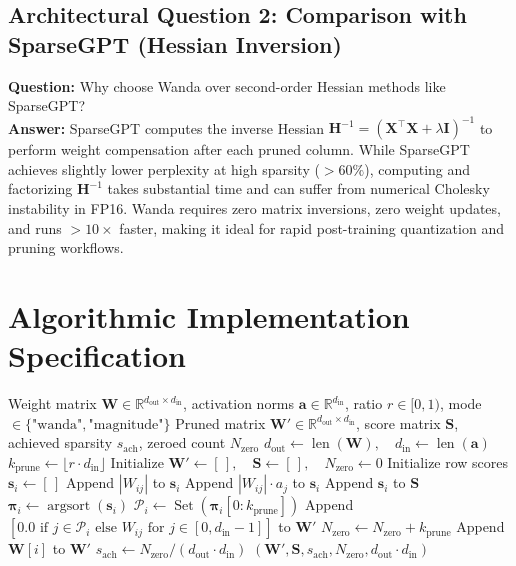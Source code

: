 \documentclass[11pt,a4paper]{article}
\theoremstyle{definition}
\begin{document}
\subsection{Architectural Question 2: Comparison with SparseGPT (Hessian Inversion)}
\textbf{Question:} Why choose Wanda over second-order Hessian methods like SparseGPT?\\
\textbf{Answer:} SparseGPT computes the inverse Hessian $\mathbf{H}^{-1} = (\mathbf{X}^\top \mathbf{X} + \lambda \mathbf{I})^{-1}$ to perform weight compensation after each pruned column. While SparseGPT achieves slightly lower perplexity at high sparsity ($>60\%$), computing and factorizing $\mathbf{H}^{-1}$ takes substantial time and can suffer from numerical Cholesky instability in FP16. Wanda requires zero matrix inversions, zero weight updates, and runs $>10\times$ faster, making it ideal for rapid post-training quantization and pruning workflows.

\section{Algorithmic Implementation Specification}

\begin{algorithm}[H]
\caption{One-Shot Structured Pruning for LLMs (Wanda)}
\begin{algorithmic}[1]
\Require Weight matrix $\mathbf{W} \in \mathbb{R}^{d_{\text{out}} \times d_{\text{in}}}$, activation norms $\mathbf{a} \in \mathbb{R}^{d_{\text{in}}}$, ratio $r \in [0, 1)$, mode $\in \{\text{"wanda"}, \text{"magnitude"}\}$
\Ensure Pruned matrix $\mathbf{W}' \in \mathbb{R}^{d_{\text{out}} \times d_{\text{in}}}$, score matrix $\mathbf{S}$, achieved sparsity $s_{\text{ach}}$, zeroed count $N_{\text{zero}}$
\State $d_{\text{out}} \gets \operatorname{len}(\mathbf{W}), \quad d_{\text{in}} \gets \operatorname{len}(\mathbf{a})$
\State $k_{\text{prune}} \gets \lfloor r \cdot d_{\text{in}} \rfloor$
\State Initialize $\mathbf{W}' \gets [\,], \quad \mathbf{S} \gets [\,], \quad N_{\text{zero}} \gets 0$
    \State Initialize row scores $\mathbf{s}_i \gets [\,]$
            \State Append $|W_{ij}|$ to $\mathbf{s}_i$
        \Else
            \State Append $|W_{ij}| \cdot a_j$ to $\mathbf{s}_i$
        \EndIf
    \EndFor
    \State Append $\mathbf{s}_i$ to $\mathbf{S}$
        \State $\boldsymbol{\pi}_i \gets \operatorname{argsort}(\mathbf{s}_i)$
        \State $\mathcal{P}_i \gets \operatorname{Set}(\boldsymbol{\pi}_i[0 : k_{\text{prune}}])$
        \State Append $[ 0.0 \text{ if } j \in \mathcal{P}_i \text{ else } W_{ij} \text{ for } j \in [0, d_{\text{in}}-1] ]$ to $\mathbf{W}'$
        \State $N_{\text{zero}} \gets N_{\text{zero}} + k_{\text{prune}}$
    \Else
        \State Append $\mathbf{W}[i]$ to $\mathbf{W}'$
    \EndIf
\EndFor
\State $s_{\text{ach}} \gets N_{\text{zero}} / (d_{\text{out}} \cdot d_{\text{in}})$
\State \Return $(\mathbf{W}', \mathbf{S}, s_{\text{ach}}, N_{\text{zero}}, d_{\text{out}} \cdot d_{\text{in}})$
\end{algorithmic}
\end{algorithm}
\end{document}
